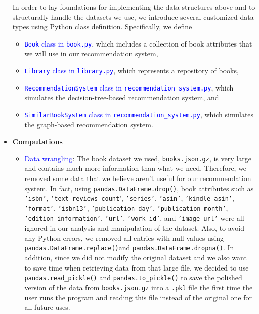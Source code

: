 \documentclass[fontsize=11pt]{article}
\begin{document}
\begin{itemize}
In order to lay foundations for implementing the data structures above and to structurally handle the datasets we use, we introduce several customized data types using Python class definition. Specifically, we define
\begin{itemize}
    \item \textcolor{blue}{\texttt{Book} class in \texttt{book.py}}, which includes a collection of book attributes that we will use in our recommendation system,
    \item \textcolor{blue}{\texttt{Library} class in \texttt{library.py}}, which represents a repository of books,
    \item \textcolor{blue}{\texttt{RecommendationSystem} class in \texttt{recommendation\_system.py}}, which simulates the decision-tree-based recommendation system, and
    \item \textcolor{blue}{\texttt{SimilarBookSystem} class in \texttt{recommendation\_system.py}}, which simulates the graph-based recommendation system.
\end{itemize}

\item \textbf{Computations}
\begin{itemize}
    \item \textcolor{blue}{Data wrangling}: The book dataset we used, \texttt{books.json.gz}, is very large and contains much more information than what we need. Therefore, we removed some data that we believe aren’t useful for our recommendation system. In fact, using \texttt{pandas.DataFrame.drop()}, book attributes such as \texttt{'isbn'}, \texttt{'text\_reviews\_count}', \texttt{'series'}, \texttt{'asin'}, \texttt{'kindle\_asin'}, \texttt{'format'}, \texttt{'isbn13'}, \texttt{'publication\_day'}, \texttt{'publication\_month'}, \texttt{'edition\_information'}, \texttt{'url'},  \texttt{'work\_id'}, and \texttt{'image\_url'} were all ignored in our analysis and manipulation of the dataset. Also, to avoid any Python errors, we removed all entries with null values using \texttt{pandas.DataFrame.replace()}and \texttt{pandas.DataFrame.dropna()}. In addition, since we did not modify the original dataset and we also want to save time when retrieving data from that large file, we decided to use \texttt{pandas.read\_pickle()} and \texttt{pandas.to\_pickle()} to save the polished version of the data from \texttt{books.json.gz} into a \texttt{.pkl} file the first time the user runs the program and reading this file instead of the original one for all future uses.


\end{itemize}
\end{itemize}
\end{document}
